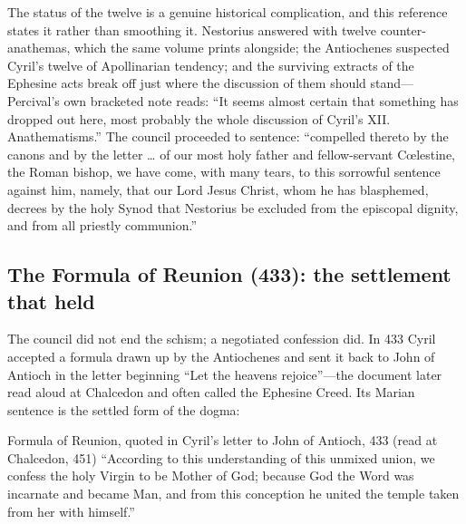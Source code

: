 The status of the twelve is a genuine historical complication, and this
reference states it rather than smoothing it. Nestorius answered with
twelve counter-anathemas, which the same volume prints alongside; the
Antiochenes suspected Cyril's twelve of Apollinarian tendency; and the
surviving extracts of the Ephesine acts break off just where the
discussion of them should stand---Percival's own bracketed note reads:
``It seems almost certain that something has dropped out here, most
probably the whole discussion of Cyril's XII.
Anathematisms.'' The council proceeded to
sentence: ``compelled thereto by the canons and by the letter \ldots{} of
our most holy father and fellow-servant C\oe lestine, the Roman bishop,
we have come, with many tears, to this sorrowful sentence against him,
namely, that our Lord Jesus Christ, whom he has blasphemed, decrees by
the holy Synod that Nestorius be excluded from the episcopal dignity, and
from all priestly communion.''

\subsection*{The Formula of Reunion (433): the settlement that held}

The council did not end the schism; a negotiated confession did. In 433
Cyril accepted a formula drawn up by the Antiochenes and sent it back to
John of Antioch in the letter beginning ``Let the heavens rejoice''---the
document later read aloud at Chalcedon and often called the Ephesine
Creed. Its Marian sentence is the settled form of the dogma:

\begin{definedtext}{Formula of Reunion, quoted in Cyril's letter to John
of Antioch, 433 (read at Chalcedon, 451)}
``According to this understanding of this unmixed union, we confess the
holy Virgin to be Mother of God; because God the Word was incarnate and
became Man, and from this conception he united the temple taken from her
with himself.''
\end{definedtext}


